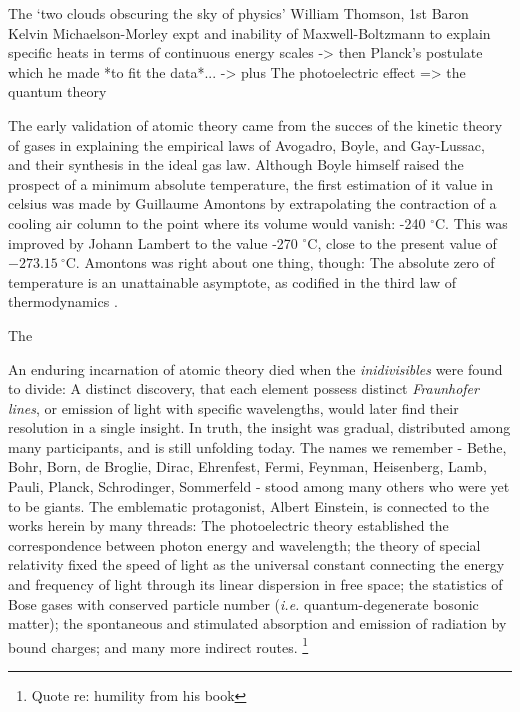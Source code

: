 	The `two clouds obscuring the sky of physics' William Thomson, 1st Baron Kelvin
	 Michaelson-Morley expt and inability of Maxwell-Boltzmann to explain specific heats in terms of continuous energy scales
	 -> then Planck's postulate which he made *to fit the data*...
	 -> plus The photoelectric effect => the quantum theory

	The early validation of atomic theory came from the succes of the kinetic theory of gases in explaining the empirical laws of Avogadro, Boyle, and Gay-Lussac, and their synthesis in the ideal gas law. Although Boyle himself raised the prospect of a minimum absolute temperature, the first estimation of it value in celsius was made by Guillaume Amontons by extrapolating the contraction of a cooling air column to the point where its volume would vanish: -240 $^\circ$C. This was improved by Johann Lambert to the value -270 $^\circ$C, close to the present value of $-273.15~^\circ$C. Amontons was right about one thing, though: The absolute zero of temperature is an unattainable asymptote, as codified in the third law of thermodynamics \cite{Masanes17}.
	
	The 


	An enduring incarnation of atomic theory died when the \emph{inidivisibles} were found to divide:
	A distinct discovery, that each element possess distinct \emph{Fraunhofer lines}, or emission of light with specific wavelengths, would later find their resolution in a single insight.
	In truth, the insight was gradual, distributed among many participants, and is still unfolding today. The names we remember - Bethe, Bohr, Born, de Broglie, Dirac, Ehrenfest, Fermi, Feynman, Heisenberg, Lamb, Pauli, Planck, Schrodinger, Sommerfeld - stood among many others who were yet to be giants. The emblematic protagonist, Albert Einstein, is connected to the works herein by many threads: The photoelectric theory established the correspondence between photon energy and wavelength; the theory of special relativity fixed the speed of light as the universal constant connecting the energy and frequency of light through its linear dispersion in free space; the statistics of Bose gases with conserved particle number (\emph{i.e.} quantum-degenerate bosonic matter); the spontaneous and stimulated absorption and emission of radiation by bound charges; and many more indirect routes. \footnote{Quote re: humility from his book}


